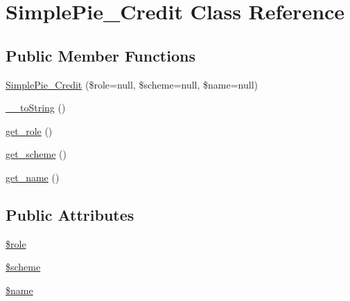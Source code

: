 \hypertarget{class_simple_pie___credit}{\section{Simple\-Pie\-\_\-\-Credit Class Reference}
\label{class_simple_pie___credit}
}
\subsection*{Public Member Functions}
\begin{DoxyCompactItemize}
\item 
\hyperlink{class_simple_pie___credit_a7a8a623e277401b720ccf98c94f2d976}{Simple\-Pie\-\_\-\-Credit} (\$role=null, \$scheme=null, \$name=null)
\item 
\hyperlink{class_simple_pie___credit_a9b905c536d4295b8eac232b2f4daa91f}{\-\_\-\-\_\-to\-String} ()
\item 
\hyperlink{class_simple_pie___credit_a1b57f03353fecc83dcf8afbd08af5f79}{get\-\_\-role} ()
\item 
\hyperlink{class_simple_pie___credit_a450b4ffb177ad0ffa1395a8ac0cafa49}{get\-\_\-scheme} ()
\item 
\hyperlink{class_simple_pie___credit_acc3c8d3087762d0025b23e7dae824364}{get\-\_\-name} ()
\end{DoxyCompactItemize}
\subsection*{Public Attributes}
\begin{DoxyCompactItemize}
\item 
\hyperlink{class_simple_pie___credit_ab1b8eab4e7cdb676c3557bd0bed00e4b}{\$role}
\item 
\hyperlink{class_simple_pie___credit_a3ca82402f182d69d85c81800e01b43e1}{\$scheme}
\item 
\hyperlink{class_simple_pie___credit_a7ebbaa18d2e8965d1a45ff9a140d6e7d}{\$name}
\end{DoxyCompactItemize}


